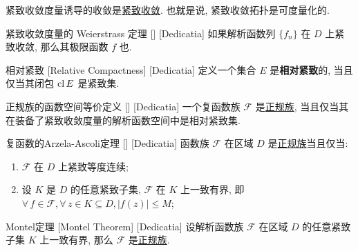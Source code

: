         \begin{rmk}
            紧致收敛度量诱导的收敛是\hyperref[dfn:Compact-Convergence]{紧致收敛}. 也就是说, 紧致收敛拓扑是可度量化的.
        \end{rmk}

        \begin{thm}
            [Weierstrass-2]
            {紧致收敛度量的 Weierstrass 定理}
            []
            [Dedicatia]
            如果解析函数列 \(\{f_n\}\) 在 \(D\) 上紧致收敛, 那么其极限函数 \(f\) 也\Analytic{}.
        \end{thm}

        \begin{dfn}
            {相对紧致}
            [Relative Compactness]
            [Dedicatia]
            定义一个集合 \(E\) 是\textbf{相对紧致}的, 当且仅当其闭包 \(\operatorname{cl} E\) 是紧致集.
        \end{dfn}

        \begin{thm}
            {正规族的函数空间等价定义}
            []
            [Dedicatia]
            一个复函数族 \(\mathcal{F}\) 是\hyperref[dfn:Normal-Family]{正规族}, 当且仅当其在装备了紧致收敛度量的解析函数空间中是相对紧致集.
        \end{thm}

        \begin{thm}
            {复函数的Arzela-Ascoli定理}
            []
            [Dedicatia]
            函数族 \(\mathcal{F}\) 在区域 \(D\) 是\hyperref[dfn:Normal-Family]{正规族}当且仅当:
            \begin{enumerate}
                \item \(\mathcal{F}\) 在 \(D\) 上紧致等度连续;
                \item 设 \(K\) 是 \(D\) 的任意紧致子集, \(\mathcal{F}\) 在 \(K\) 上一致有界, 即 \(\forall\,f\in\mathcal{F}, \forall\,z\in K\subseteq D, |f(z)|\leq M\);
            \end{enumerate}
        \end{thm}

        \begin{thm}
            [Montel]
            {Montel定理}
            [Montel Theorem]
            [Dedicatia]
            设解析函数族 \(\mathcal{F}\) 在区域 \(D\) 的任意紧致子集 \(K\) 上一致有界, 那么 \(\mathcal{F}\) 是\hyperref[dfn:Normal-Family]{正规族}.
        \end{thm}

